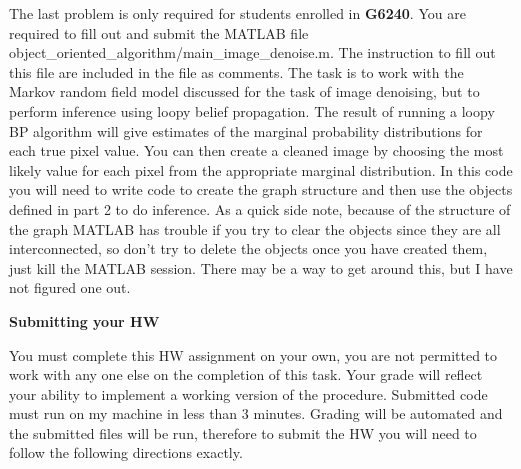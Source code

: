 \documentclass[12pt]{article}
\begin{document}
	 

 {
	The last problem is only required for students enrolled in {\bf G6240}.  You are required to fill out and submit the MATLAB file object\_oriented\_algorithm/main\_image\_denoise.m.  The instruction to fill out this file are included in the file as comments.  The task is to work with the Markov random field model discussed for the task of image denoising, but to perform inference using loopy belief propagation.  The result of running a loopy BP algorithm will give estimates of the marginal probability distributions for each true pixel value.  You can then create a cleaned image by choosing the most likely value for each pixel from the appropriate marginal distribution.  In this code you will need to write code to create the graph structure and then use the objects defined in part 2 to do inference.  As a quick side note, because of the structure of the graph MATLAB has trouble if you try to clear the objects since they are all interconnected, so don't try to delete the objects once you have created them, just kill the MATLAB session.  There may be a way to get around this, but I have not figured one out.\\
	}
	


{\bf Submitting your HW}

You must complete this HW assignment on your own, you are not permitted to work with any one else on the completion of this task.  Your grade will reflect your ability to implement a working version of the procedure.  Submitted code must run on my machine in less than 3 minutes.  Grading will be automated and the submitted files will be run, therefore to submit the HW you will need to follow the following directions exactly.
\end{document}

